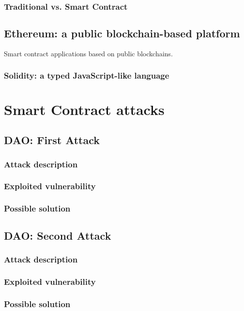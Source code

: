 \subsubsection{Traditional vs. Smart Contract}

\subsection{Ethereum: a public blockchain-based platform}
Smart contract applications based on public blockchains.


\subsubsection{Solidity: a typed JavaScript-like language}


\section{Smart Contract attacks}

\subsection{DAO: First Attack}
\subsubsection{Attack description}
\subsubsection{Exploited vulnerability}
\subsubsection{Possible solution}

\subsection{DAO: Second Attack}
\subsubsection{Attack description}
\subsubsection{Exploited vulnerability}
\subsubsection{Possible solution}


